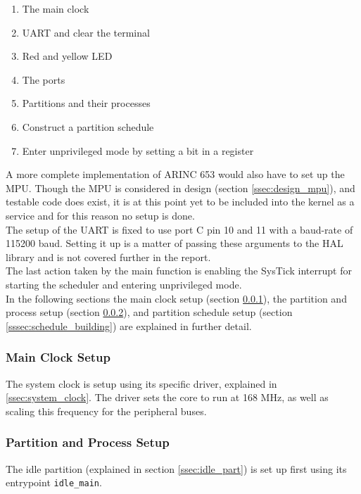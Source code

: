 \begin{enumerate}
	\item The main clock
	\item UART and clear the terminal
	\item Red and yellow LED
	\item The ports
	\item Partitions and their processes
	\item Construct a partition schedule
	\item Enter unprivileged mode by setting a bit in a register
\end{enumerate}

A more complete implementation of ARINC 653 would also have to set up the MPU.
Though the MPU is considered in design (section \ref{ssec:design_mpu}),
and testable code does exist, it is at this point yet
to be included into the kernel as a service and for this reason no setup is done.\\

The setup of the UART is fixed to use port C pin 10 and 11 with a baud-rate of
115200 baud. Setting it up is a matter of passing these arguments to the HAL
library and is not covered further in the report.\\

The last action taken by the main function is enabling the SysTick interrupt
for starting the scheduler and entering unprivileged mode.\\

In the following sections the main clock setup (section \ref{impl:clock_setup}),
the partition and process setup (section \ref{impl:part_proc_setup}), and
partition schedule setup (section \ref{sssec:schedule_building}) are explained in
further detail.


\subsubsection{Main Clock Setup}
\label{impl:clock_setup}
The system clock is setup using its specific driver, explained in
\ref{ssec:system_clock}. The driver sets the core to run at 168 MHz, as
well as scaling this frequency for the peripheral buses.


\subsubsection{Partition and Process Setup}
\label{impl:part_proc_setup}
The idle partition (explained in section \ref{ssec:idle_part}) is set up
first using its entrypoint \texttt{idle\_main}.\\

